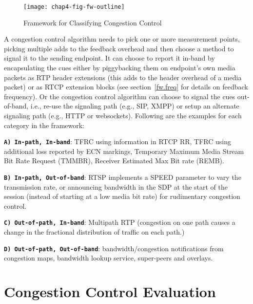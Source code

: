 \begin{figure}
\texttt{[image: chap4-fig-fw-outline]}
\caption{Framework for Classifying Congestion Control~\cite{Singh:PhDFw}}
\label{fig:4:fw}
\end{figure}

A congestion control algorithm needs to pick one or more measurement points,
picking multiple adds to the feedback overhead and then choose a method to
signal it to the sending endpoint. It can choose to report it in-band by
encapsulating the cues either by piggybacking them on endpoint's own media
packets as RTP header extensions (this adds to the header overhead of a media
packet) or as RTCP extension blocks (see section~\ref{fw.freq} for details on
feedback frequency). Or the congestion control algorithm can choose to signal
the cues out-of-band, i.e., re-use the signaling path (e.g., SIP, XMPP) or
setup an alternate signaling path (e.g., HTTP or websockets). Following are
the examples for each category in the framework:

\textbf{\texttt{A) In-path, In-band}}: TFRC using information in RTCP RR, TFRC
using additional loss reported by ECN markings, Temporary Maximum Media Stream
Bit Rate Request (TMMBR), Receiver Estimated Max Bit rate (REMB).

\textbf{\texttt{B) In-path, Out-of-band}}: RTSP implements a SPEED parameter
to vary the transmission rate, or announcing bandwidth in the SDP at the start
of the session (instead of starting at a low media bit rate) for rudimentary
congestion control.

\textbf{\texttt{C) Out-of-path, In-band}}: Multipath RTP (congestion on one
path causes a change in the fractional distribution of traffic on each path.)

\textbf{\texttt{D) Out-of-path, Out-of-band}}: bandwidth/congestion
notifications from congestion maps, bandwidth lookup service, super-peers and
overlays.




\section{Congestion Control Evaluation}
\label{fw.cc.eval}

